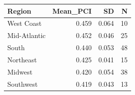 \begin{tabular}{lrrr}
\toprule
Region & Mean_PCI & SD & N \\
\midrule
West Coast & 0.459 & 0.064 & 10 \\
Mid-Atlantic & 0.452 & 0.046 & 25 \\
South & 0.440 & 0.053 & 48 \\
Northeast & 0.425 & 0.041 & 15 \\
Midwest & 0.420 & 0.054 & 38 \\
Southwest & 0.419 & 0.043 & 13 \\
\bottomrule
\end{tabular}
